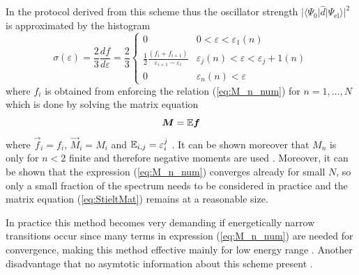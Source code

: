 In the protocol derived from this scheme thus the oscillator strength $|\langle \Psi_0|\hat{d}|\Psi_\text{el}\rangle|^2$ is approximated by the histogram
\begin{equation}
\sigma(\varepsilon)=\frac 23 \frac{df}{d\varepsilon}
      =\frac 23 \begin{cases} 0 & 0< \varepsilon <\varepsilon_1(n) \\
      \frac 12 \frac{(f_i+f_{i+1})}{\varepsilon_{i+1}-\varepsilon_i}  & \varepsilon_j(n)<\varepsilon<\varepsilon_j+1(n)\\
      0   & \varepsilon_n(n)<\varepsilon \end{cases}
\end{equation}
where $f_i$ is obtained from enforcing the relation (\ref{eq:M_n_num}) for $n=1,\hdots, N$ which is done by solving the matrix equation
\begin{equation} \label{eq:StieltMat}
   \bm{M}=\mathbb{E}\bm{f}
\end{equation}
where $\vec{f}_i=f_i$, $\vec{M}_i=M_i$ and $\mathbb{E}_{i,j}=\varepsilon_i^j$ \cite{langhoff3}.
It can be shown moreover that $M_n$ is only for $n<2$ finite and therefore negative moments are used \cite{stieltjesCeder}.
Moreover, it can be shown that the expression (\ref{eq:M_n_num}) converges already for small $N$, so only a small fraction of the spectrum needs to be considered in practice and the matrix equation (\ref{eq:StieltMat}) remains at a reasonable size. 

In practice this method becomes very demanding if energetically narrow transitions occur since many terms in expression (\ref{eq:M_n_num}) are needed for convergence, making this method effective mainly for low energy range \cite{H2pDeCleva}.
Another disadvantage that no asymtotic information about this scheme present \cite{H2pDeCleva}.

